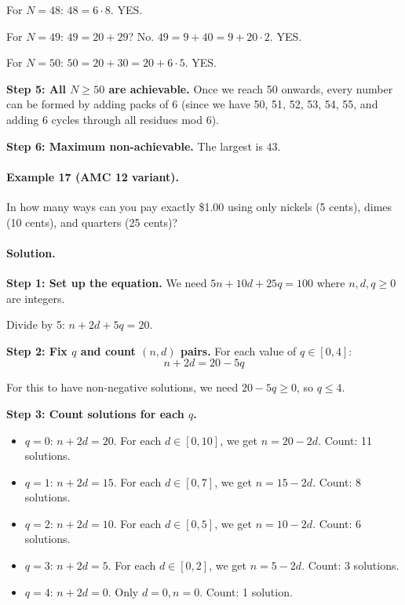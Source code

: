 \documentclass[12pt]{extarticle}
\begin{document}
\medskip

For $N = 48$: 
$48 = 6 \cdot 8$. YES.

\medskip

For $N = 49$: 
$49 = 20 + 29$? No. 
$49 = 9 + 40 = 9 + 20 \cdot 2$. YES.

\medskip

For $N = 50$: 
$50 = 20 + 30 = 20 + 6 \cdot 5$. YES.

\textbf{Step 5: All $N \ge 50$ are achievable.} Once we reach 50 onwards, every number can be formed by adding packs of 6 (since we have 50, 51, 52, 53, 54, 55, and adding 6 cycles through all residues mod 6).

\textbf{Step 6: Maximum non-achievable.} The largest is $\boxed{43}$.

\paragraph{Example 17 (AMC 12 variant).} In how many ways can you pay exactly \$1.00 using only nickels (5 cents), dimes (10 cents), and quarters (25 cents)?

\paragraph{Solution.}
\textbf{Step 1: Set up the equation.} We need $5n + 10d + 25q = 100$ where $n, d, q \ge 0$ are integers.

Divide by 5: $n + 2d + 5q = 20$.

\textbf{Step 2: Fix $q$ and count $(n, d)$ pairs.} For each value of $q \in [0, 4]$:
\[
n + 2d = 20 - 5q
\]

For this to have non-negative solutions, we need $20 - 5q \ge 0$, so $q \le 4$.

\textbf{Step 3: Count solutions for each $q$.}
\begin{itemize}
    \item $q = 0$: $n + 2d = 20$. For each $d \in [0, 10]$, we get $n = 20 - 2d$. Count: 11 solutions.
    \item $q = 1$: $n + 2d = 15$. For each $d \in [0, 7]$, we get $n = 15 - 2d$. Count: 8 solutions.
    \item $q = 2$: $n + 2d = 10$. For each $d \in [0, 5]$, we get $n = 10 - 2d$. Count: 6 solutions.
    \item $q = 3$: $n + 2d = 5$. For each $d \in [0, 2]$, we get $n = 5 - 2d$. Count: 3 solutions.
    \item $q = 4$: $n + 2d = 0$. Only $d = 0, n = 0$. Count: 1 solution.
\end{itemize}
\end{document}
